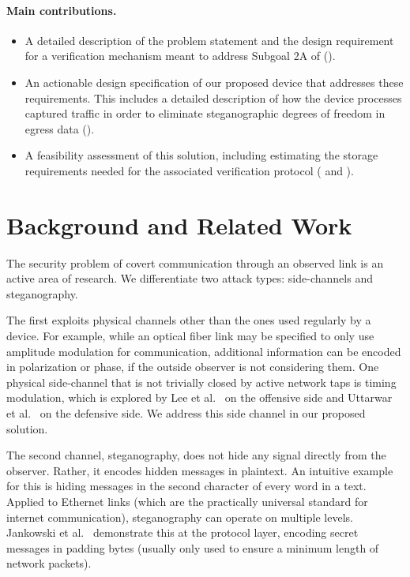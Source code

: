 \documentclass{article}
\begin{document}
\paragraph{Main contributions.}
\begin{itemize}
\item A detailed description of the problem statement and the design requirement for a verification mechanism meant to address Subgoal 2A of \citet{baker2025verifying} ().
\item An actionable design specification of our proposed device that addresses these requirements. This includes a detailed description of how the device processes captured traffic in order to eliminate steganographic degrees of freedom in egress data ().
\item A feasibility assessment of this solution, including estimating the storage requirements needed for the associated verification protocol ( and ).
\end{itemize}

\section{Background and Related Work}
\label{sec:background}

The security problem of covert communication through an observed link is an active area of research. We differentiate two attack types: side-channels and steganography.

The first exploits physical channels other than the ones used regularly by a device. For example, while an optical fiber link may be specified to only use amplitude modulation for communication, additional information can be encoded in polarization or phase, if the outside observer is not considering them. One physical side-channel that is not trivially closed by active network taps is timing modulation, which is explored by Lee et al.~\cite{lee2014phy} on the offensive side and Uttarwar et al.~\cite{uttarwar2025delay} on the defensive side. We address this side channel in our proposed solution.

The second channel, steganography, does not hide any signal directly from the observer. Rather, it encodes hidden messages in plaintext. An intuitive example for this is hiding messages in the second character of every word in a text. Applied to Ethernet links (which are the practically universal standard for internet communication), steganography can operate on multiple levels. Jankowski et al.~\cite{jankowski2013padsteg} demonstrate this at the protocol layer, encoding secret messages in padding bytes (usually only used to ensure a minimum length of network packets).
\end{document}
